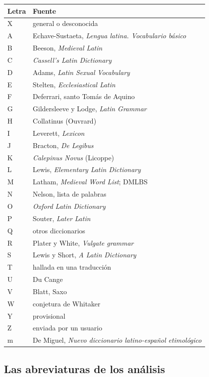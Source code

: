 \documentclass[12pt,
              article,
              oneside
              ]{memoir}
\begin{document}
\begin{longtable}{@{}lp{}@{}}
\toprule
Letra & Fuente\\
\midrule
\endhead
X & general o desconocida\\
A & Echave-Sustaeta, \textit{Lengua latina. Vocabulario básico}\\
B & Beeson, \textit{Medieval Latin}\\
C & \textit{Cassell's Latin Dictionary}\\
D & Adams, \textit{Latin Sexual Vocabulary}\\
E & Stelten, \textit{Ecclesiastical Latin}\\
F & Deferrari, santo Tomás de Aquino\\
G & Gildersleeve y Lodge, \textit{Latin Grammar}\\
H & Collatinus (Ouvrard)\\
I & Leverett, \textit{Lexicon}\\
J & Bracton, \textit{De Legibus}\\
K & \textit{Calepinus Novus} (Licoppe)\\
L & Lewis, \textit{Elementary Latin Dictionary}\\
M & Latham, \textit{Medieval Word List}; DMLBS\\
N & Nelson, lista de palabras\\
O & \textit{Oxford Latin Dictionary}\\
P & Souter, \textit{Later Latin}\\
Q & otros diccionarios\\
R & Plater y White, \textit{Vulgate grammar}\\
S & Lewis y Short, \textit{A Latin Dictionary}\\
T & hallada en una traducción\\
U & Du Cange\\
V & Blatt, Saxo\\
W & conjetura de Whitaker\\
Y & provisional\\
Z & enviada por un usuario\\
m & De Miguel, \textit{Nuevo diccionario latino-español etimológico}\\
\bottomrule
\end{longtable}

\subsection{Las abreviaturas de los análisis}
\label{sec:glosses}
\end{document}
